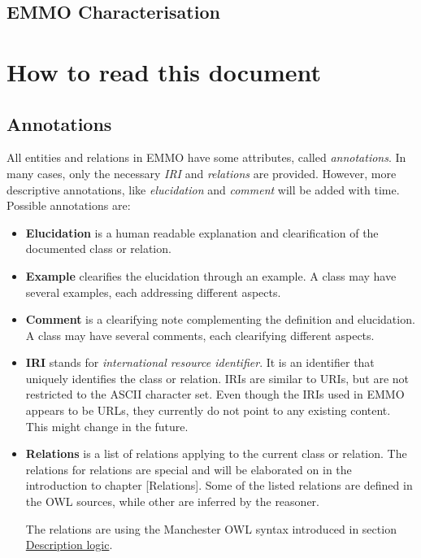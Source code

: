 \documentclass[a4paper,]{report}
\providecommand{\tightlist}{%
  \setlength{\itemsep}{0pt}\setlength{\parskip}{0pt}}
\begin{document}
\hypertarget{emmo-characterisation}{%
\subsection{EMMO Characterisation}\label{emmo-characterisation}}

\hypertarget{how-to-read-this-document}{%
\section{How to read this document}\label{how-to-read-this-document}}

\hypertarget{annotations}{%
\subsection{Annotations}\label{annotations}}

All entities and relations in EMMO have some attributes, called
\emph{annotations}. In many cases, only the necessary \emph{IRI} and
\emph{relations} are provided. However, more descriptive annotations,
like \emph{elucidation} and \emph{comment} will be added with time.
Possible annotations are:

\begin{itemize}
\tightlist
\item
  \textbf{Elucidation} is a human readable explanation and
  clearification of the documented class or relation.
\end{itemize}

\begin{itemize}
\item
  \textbf{Example} clearifies the elucidation through an example. A
  class may have several examples, each addressing different aspects.
\item
  \textbf{Comment} is a clearifying note complementing the definition
  and elucidation. A class may have several comments, each clearifying
  different aspects.
\item
  \textbf{IRI} stands for \emph{international resource identifier}. It
  is an identifier that uniquely identifies the class or relation. IRIs
  are similar to URIs, but are not restricted to the ASCII character
  set. Even though the IRIs used in EMMO appears to be URLs, they
  currently do not point to any existing content. This might change in
  the future.
\item
  \textbf{Relations} is a list of relations applying to the current
  class or relation. The relations for relations are special and will be
  elaborated on in the introduction to chapter {[}Relations{]}. Some of
  the listed relations are defined in the OWL sources, while other are
  inferred by the reasoner.

  The relations are using the Manchester OWL syntax introduced in
  section \protect\hyperlink{description-logic}{Description logic}.
\end{itemize}
\end{document}
